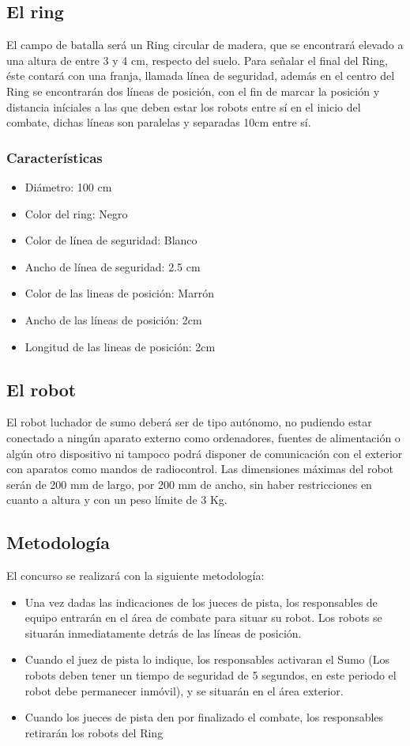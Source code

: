 \documentclass[12pt]{book}
\theoremstyle{definition}
\theoremstyle{remark}
\theoremstyle{plain}
\begin{document}
\subsection{El ring}
El campo de batalla será un Ring circular de madera, que se encontrará elevado a una altura de entre 3 y 4 cm, respecto del suelo. 
Para señalar el final del Ring, éste contará con una franja, llamada línea de seguridad, además en el centro del Ring se encontrarán 
dos líneas de posición, con el fin de marcar la posición y distancia iníciales a las que deben estar los robots entre sí en el inicio 
del combate, dichas líneas son paralelas y separadas 10cm entre sí.

\subsubsection{Características}
\begin{itemize}
 \item Diámetro: 100 cm
 \item Color del ring: Negro
 \item Color de línea de seguridad: Blanco
 \item Ancho de línea de seguridad: 2.5 cm
 \item Color de las lineas de posición: Marrón
 \item Ancho de las líneas de posición: 2cm
 \item Longitud de las lineas de posición: 2cm
\end{itemize}

\subsection{El robot}

El robot luchador de sumo deberá ser de tipo autónomo, no pudiendo estar conectado a ningún aparato externo como ordenadores, 
fuentes de alimentación o algún otro dispositivo ni tampoco podrá disponer de comunicación con el exterior con aparatos como
 mandos de radiocontrol. Las dimensiones máximas del robot serán de 200 mm de largo, por 200 mm de ancho, sin haber 
restricciones en cuanto a altura y con un peso límite de 3 Kg.

\subsection{Metodología}
El concurso se realizará con la siguiente metodología: 
\begin{itemize}
 \item Una vez dadas las indicaciones de los jueces de pista, los responsables de equipo entrarán en el área de combate para 
situar su robot. Los robots se situarán inmediatamente detrás de las líneas de posición. 
 \item Cuando el juez de pista lo indique, los responsables activaran el Sumo (Los robots deben tener un tiempo de seguridad
 de 5 segundos, en este periodo el robot debe permanecer inmóvil), y se situarán en el área exterior. 
 \item Cuando los jueces de pista den por finalizado el combate, los responsables retirarán los robots del Ring 
\end{itemize}
\end{document}
